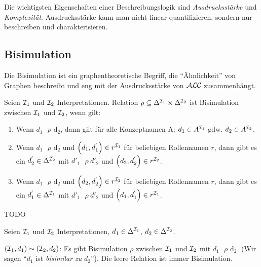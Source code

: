 Die wichtigsten Eigenschaften einer Beschreibungslogik sind
\emph{Ausdrucksstärke} und \emph{Komplexität}. Ausdrucksstärke kann man nicht
linear quantifizieren, sondern nur beschreiben und charakterisieren.

\subsection{Bisimulation}\label{bisimulation}

Die Bisimulation ist ein graphentheoretische Begriff, die \enquote{Ähnlichkeit} von Graphen beschreibt und eng mit der Ausdrucksstärke von $\mathcal{A}\mathcal{L}\mathcal{C}$ zusammenhängt.

\begin{definition}[Bisimulation]

Seien $\mathcal{I}_1$ und $\mathcal{I}_2$ Interpretationen. Relation
$\rho \subseteq \Delta^{\mathcal{I}_1} \times \Delta^{\mathcal{I}_2}$ ist Bisimulation
zwischen $\mathcal{I}_1$ und $\mathcal{I}_2$, wenn gilt:

\begin{enumerate}
\def\labelenumi{\arabic{enumi}.}
\item
  Wenn $d_1\text{\ $\rho$}\text{\ d}_2$, dann gilt für alle
  Konzeptnamen A: $d_1 \in A^{\mathcal{I}_1}$ gdw. $d_2 \in A^{\mathcal{I}_2}$.
\item
  Wenn $d_1\text{\ $\rho$}\text{\ d}_2$ und
  $\left( d_1,d_1^{'} \right) \in r^{\MI_1}$ für beliebigen
  Rollennamen $r$, dann gibt es ein $d_2^{'} \in \Delta^{\mathcal{I}_2}$
  mit ${d'}_1\text{\ $\rho$}{\ d'}_2$ und
  $\left( d_2,d_2^{'} \right) \in r^{\MI_2}$.
\item
  Wenn $d_1\text{\ $\rho$}\text{\ d}_2$ und
  $\left( d_2,d_2^{'} \right) \in r^{\MI_2}$ für beliebigen
  Rollennamen $r$, dann gibt es ein $d_1^{'} \in \Delta^{\mathcal{I}_1}$
  mit ${d'}_1\text{\ $\rho$}{\ d'}_2$ und
  $\left( d_1,d_1^{'} \right) \in r^{\MI_1}$.
\end{enumerate}
\end{definition}

\begin{tafel}[TODO]
    TODO
\end{tafel}

Seien $\mathcal{I}_1$ und $\mathcal{I}_2$ Interpretationen,
$d_1 \in \Delta^{\mathcal{I}_1}$, $d_2 \in \Delta^{\mathcal{I}_2}$.

$(\mathcal{I}_1,d_1) \sim (\mathcal{I}_2,d_2)$: Es gibt Bisimulation $\rho$
zwischen $\mathcal{I}_1$ und $\mathcal{I}_2$ mit $d_1\text{\ $\rho$}\text{\ d}_2$. (Wir sagen \enquote{$d_1$ ist \emph{bisimilar zu} $d_2$}).
Die leere Relation ist immer Bisimulation.

